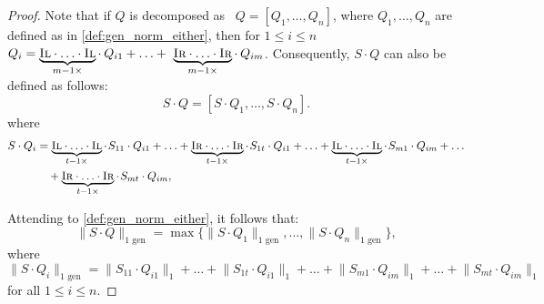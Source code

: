 \begin{proof}
Note that if $Q$ is decomposed as  $Q=[Q_1, \ldots, Q_n]$, where $Q_1, \ldots, Q_n$ are defined as in \autoref{def:gen_norm_either}, then for $ 1 \leq i \leq n$  $Q_i = \underbrace{\textsc{Il} \cdot \ldots \cdot \textsc{Il}}_{m-1 \times} \cdot \hspace{2pt} Q_{i1} + \ldots +  \underbrace{\textsc{Ir} \cdot \ldots \cdot \textsc{Ir}}_{m-1 \times} \cdot \hspace{2pt} Q_{im}$.
Consequently, $S \cdot Q$ can also be defined as follows:
\begin{equation}
  S \cdot Q = [S \cdot Q_1, \ldots, S \cdot Q_n].
\end {equation}
where 
\begin{equation}
  \begin{split}
  S \cdot Q_i & = \underbrace{\textsc{Il} \cdot \ldots \cdot \textsc{Il}}_{t-1 \times} \cdot \hspace{1pt} S_{11} \cdot Q_{i1} + \ldots +   \underbrace{\textsc{Ir} \cdot \ldots \cdot \textsc{Ir}}_{t-1 \times}\cdot \hspace{1pt} S_{1t} \cdot Q_{i1} + \ldots +  \underbrace{\textsc{Il} \cdot \ldots \cdot \textsc{Il}}_{t-1 \times} \cdot\hspace{1pt} S_{m1} \cdot Q_{im} +  \ldots \\
  & \hspace{10pt}  + \underbrace{\textsc{Ir} \cdot \ldots \cdot \textsc{Ir}}_{t-1 \times}\cdot \hspace{1pt} S_{mt} \cdot Q_{im},
  \end{split}
\end{equation}


Attending to \autoref{def:gen_norm_either}, it follows that:
\begin{equation} \label{eq:sq_decomposed_norm}
\lVert S \cdot  Q \rVert_{1 \text{ gen}} = \max \{ \lVert S \cdot Q_1 \rVert_{1 \text{ gen}}, \ldots, \lVert S \cdot Q_n \rVert_{1 \text{ gen}} \},
\end{equation}
where 
\begin{equation} \label{eq:sqi_norm}
\lVert S \cdot Q_i \rVert_{1 \text{ gen}} =  \lVert S_{11} \cdot Q_{i1} \rVert_{1} + \ldots + \lVert S_{1t} \cdot Q_{i1} \rVert_{1} + \ldots +  \lVert S_{m1} \cdot Q_{im} \rVert_{1} +  \ldots +  \lVert S_{mt} \cdot Q_{im} \rVert_{1}
\end{equation} 
for all $1 \leq i \leq n$.


\end{proof}
